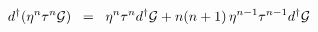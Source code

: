 \begin{equation}
d^{\dagger} ( \eta^n \tau^{n} {\cal{G}} ) \;\; = \;\; \eta^n \tau^n d^{\dagger} {\cal{G}} + n(n+1)\, \eta^{n-1} \tau^{n-1} d^{\dagger} {\cal{G}}
\label{eq:x3}
\end{equation}

